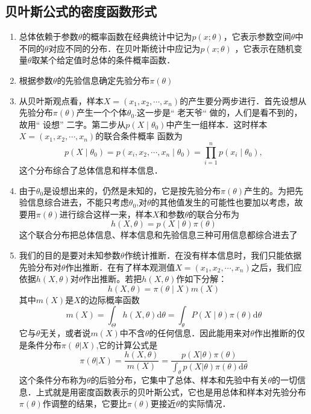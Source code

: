 \subsection{贝叶斯公式的密度函数形式}
\begin{enumerate}[(1)]
    \item 总体依赖于参数$\theta$的概率函数在经典统计中记为$p(x;\theta)$，它表示参数空间$\theta$中不同的$\theta$对应不同的分布．在贝叶斯统计中应记为$p(x;\theta)$ ，它表示在随机变量$\theta$取某个给定值时总体的条件概率函数．
    \item 根据参数$\theta$的先验信息确定先验分布$\pi\left({\theta}\right)$
    \item 从贝叶斯观点看，样本$X=(x_{1},x_{2},\cdots,x_{n})$的产生要分两步进行．首先设想从先验分布$\pi\left({\theta}\right)$产生一个个体$\theta_0$.这一步是“ 老天爷“ 做的，人们是看不到的，故用“ 设想”
          二字。第二步从$p(X\mid\theta_{0})$中产生一组样本．这时样本$X=(x_{1},x_{2},\cdots,x_{n})$的联合条件概率
          函数为
          $$
              p(X\mid\theta_{0})=p(x_{i},x_{2},\cdots,x_{n}\mid\theta_{0})=\prod_{i=1}^{n}p(x_{i}\mid\theta_{0}),
          $$
          这个分布综合了总体信息和样本信息．
    \item 由于$\theta_0$是设想出来的，仍然是未知的，它是按先验分布$\pi\left({\theta}\right)$产生的。为把先验信息综合进去，不能只考虑$\theta_0$,对$\theta$的其他值发生的可能性也要加以考虑，故要用$\pi\left({\theta}\right)$进行综合这样一来，样本$X$和参数$\theta$的联合分布为$$
              h\left(X,\theta\right)=p\left(X\mid\theta\right)\pi\left(\theta\right)
          $$
          这个联合分布把总体信息、样本信息和先验信息三种可用信息都综合进去了
    \item 我们的目的是要对未知参数$\theta$作统计推断．在没有样本信息时，我们只能依据
          先验分布对$\theta$作出推断．在有了样本观测值$X=({x_{1},x_{2},\cdots,x_{n}})$之后，我们应依据$h(X,\theta)$对$\theta$作出推断。若把$h(X,\theta)$作如下分解：
          $$
              h\left(X,\theta\right)=\pi\left(\theta\mid X\right)m\left(X\right)
          $$
          其中$m(X)$是$X$的边际概率函数
          $$
              m\left(X\right)=\int_{\Theta}h\left(X,\theta\right)\mathrm{d}\theta =\int_{\theta}P\left(X\mid\theta\right)\pi\left(\theta\right)\mathrm{d}\theta
          $$
          它与$\theta$无关，或者说$m(X)$中不含$\theta$的任何信息．因此能用来对$\theta$作出推断的仅是条件分布$\pi(\mathrm{~}\theta|X)$,它的计算公式是
          $$
              \pi(\theta|X)=\frac{h(X,\theta)}{m(X)}=\frac{p(X|\theta)\pi(\theta)}{\int_{\theta}p(X|\theta)\pi(\theta)\mathrm{d}\theta}
          $$
          这个条件分布称为$\theta$的后验分布，它集中了总体、样本和先验中有关$\theta$的一切信息．上式就是用密度函数表示的贝叶斯公式，它也是用总体和样本对先验分布$\pi(\theta)$作调整的结果，它要比$\pi(\theta)$更接近$\theta$的实际情况．
\end{enumerate}
